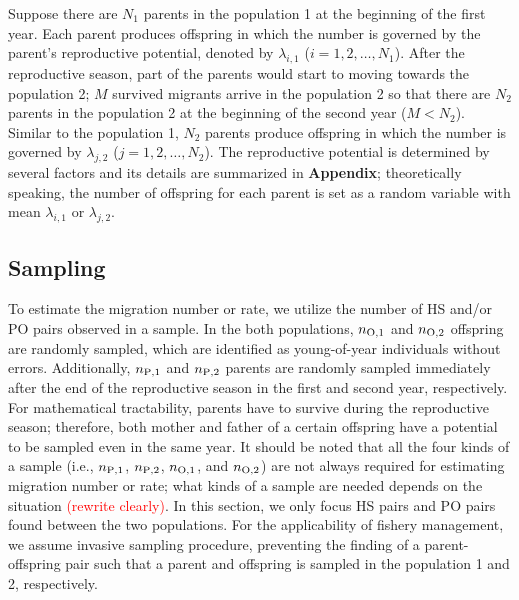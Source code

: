 \documentclass[12pt, English]{article}
\def\RED#1{\textcolor{red}{#1}} %
\begin{document}
\begin{spacing}{1.9}
Suppose there are $N_1$ parents in the population 1 at the beginning of the first year. Each parent produces offspring in which the number is governed by the parent's reproductive potential, denoted by $\lambda_{i,1}$ ($i=1,2,\ldots,N_1$). After the reproductive season, part of the parents would start to moving towards the population 2; $M$ survived migrants arrive in the population 2 so that there are $N_2$ parents in the population 2 at the beginning of the second year ($M < N_2$). Similar to the population 1, $N_2$ parents produce offspring in which the number is governed by $\lambda_{j,2}$ ($j=1,2,\ldots,N_2$). The reproductive potential is determined by several factors and its details are summarized in {\bf Appendix}; theoretically speaking, the number of offspring for each parent is set as a random variable with mean $\lambda_{i,1}$ or $\lambda_{j,2}$. 

\begin{center}
\end{center}

\subsection{Sampling}

To estimate the migration number or rate, we utilize the number of HS and/or PO pairs observed in a sample. In the both populations, $n_{\rm O, 1}$ and $n_{\rm O, 2}$ offspring are randomly sampled, which are identified as young-of-year individuals without errors. Additionally, $n_{\rm P, 1}$ and $n_{\rm P, 2}$ parents are randomly sampled immediately after the end of the reproductive season in the first and second year, respectively. For mathematical tractability, parents have to survive during the reproductive season; therefore, both mother and father of a certain offspring have a potential to be sampled even in the same year. It should be noted that all the four kinds of a sample (i.e., $n_{\rm P, 1}$, $n_{\rm P, 2}$, $n_{\rm O, 1}$, and $n_{\rm O, 2}$) are not always required for estimating migration number or rate; what kinds of a sample are needed depends on the situation \RED{(rewrite clearly)}. In this section, we only focus HS pairs and PO pairs found between the two populations. For the applicability of fishery management, we assume invasive sampling procedure, preventing the finding of a parent-offspring pair such that a parent and offspring is sampled in the population 1 and 2, respectively. 


\end{spacing}
\end{document}
